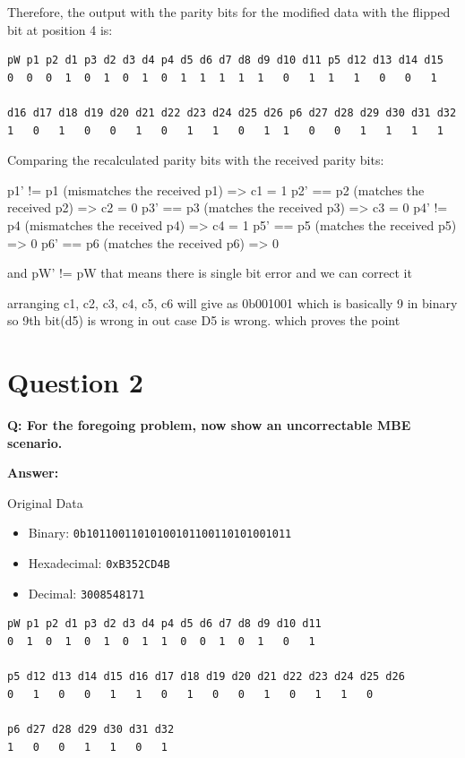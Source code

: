 \documentclass[a4paper,11pt]{article}%
\newenvironment{qanda}{\setlength{\parindent}{0pt}}{\bigskip}
\newcommand{\Q}{\bigskip\bfseries Q: }
\newcommand{\A}{\par\textbf{Answer: } \normalfont}
\begin{document}
\begin{qanda}
		Therefore, the output with the parity bits for the modified data with the flipped bit at position 4 is:
		
\begin{verbatim}
pW p1 p2 d1 p3 d2 d3 d4 p4 d5 d6 d7 d8 d9 d10 d11 p5 d12 d13 d14 d15
0  0  0  1  0  1  0  1  0  1  1  1  1  1   0   1  1   1   0   0   1

d16 d17 d18 d19 d20 d21 d22 d23 d24 d25 d26 p6 d27 d28 d29 d30 d31 d32
1   0   1   0   0   1   0   1   1   0   1  1   0   0   1   1   1   1
\end{verbatim}

Comparing the recalculated parity bits with the received parity bits:

p1' != p1 (mismatches the received p1) => c1 = 1
p2' == p2 (matches the received p2) => c2 = 0
p3' == p3 (matches the received p3) => c3 = 0
p4' != p4 (mismatches the received p4) => c4 = 1
p5' == p5 (matches the received p5) => 0
p6' == p6 (matches the received p6) => 0


and pW' != pW that means there is single bit error and we can correct it

arranging c1, c2, c3, c4, c5, c6 will give as 0b001001 which is basically 9 in binary so 9th bit(d5) is wrong in out case D5 is wrong. which proves the point
	\pagebreak
	\section{Question 2}
	\Q   For the foregoing problem, now show an uncorrectable MBE scenario.
	\A

	Original Data
	\begin{itemize}
	\item Binary: \texttt{0b10110011010100101100110101001011}
	\item Hexadecimal: \texttt{0xB352CD4B}
	\item Decimal: \texttt{3008548171}
	\end{itemize}
	
\begin{verbatim}
pW p1 p2 d1 p3 d2 d3 d4 p4 d5 d6 d7 d8 d9 d10 d11
0  1  0  1  0  1  0  1  1  0  0  1  0  1   0   1

p5 d12 d13 d14 d15 d16 d17 d18 d19 d20 d21 d22 d23 d24 d25 d26
0   1   0   0   1   1   0   1   0   0   1   0   1   1   0

p6 d27 d28 d29 d30 d31 d32
1   0   0   1   1   0   1
\end{verbatim}


\end{qanda}
\end{document}

